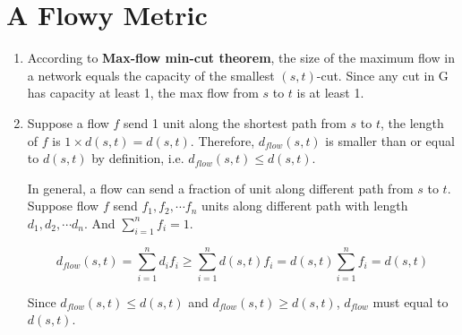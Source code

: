 \documentclass[11pt]{article}
\newenvironment{qparts}{\begin{enumerate}[{(}a{)}]}{\end{enumerate}}
\begin{document}
\section{A Flowy Metric}
\begin{qparts}
	
	\item 

	According to \textbf{Max-flow min-cut theorem}, the size of the maximum flow in a network equals the capacity of the smallest $(s, t)$-cut. Since any cut in G has capacity at least 1, the max flow from $s$ to $t$ is at least 1.
	
	\item
	
	Suppose a flow $f$ send 1 unit along the shortest path from $s$ to $t$, the length of $f$ is $1 \times d(s, t) = d(s, t)$. Therefore, $d_{flow}(s,t)$ is smaller than or equal to $d(s,t)$ by definition, i.e. $d_{flow}(s,t) \le d(s,t)$.
	
	In general, a flow can send a fraction of unit along different path from $s$ to $t$. Suppose flow $f$ send $f_1, f_2, \cdots f_n$ units along different path with length $d_1, d_2, \cdots d_n$. And $\sum_{i=1}^n f_i = 1$.
	
	\[
		d_{flow}(s,t) = \sum_{i=1}^n d_if_i \ge \sum_{i=1}^n d(s,t) f_i = d(s,t) \sum_{i=1}^n  f_i = d(s,t)
	\]
	
	Since $d_{flow}(s,t) \le d(s,t)$ and $d_{flow}(s,t) \ge d(s,t)$, $d_{flow}$ must equal to $d(s,t)$.
		
\end{qparts}
\end{document}
